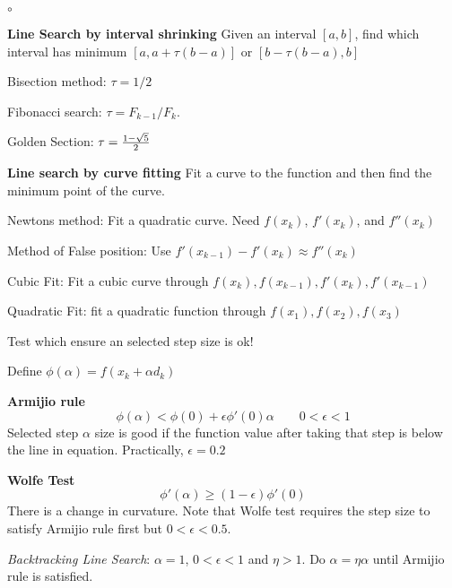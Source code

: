 \begin{slide}
\begin{list}{$\mathbf \circ$}{\setlength{}}
\item[\textbf{Line Search by interval shrinking}]
	Given an interval $[a,b]$, find which interval has minimum $[a,a+\tau(b-a)]$ or $[b-\tau(b-a),b]$
	\item Bisection method: $\tau = 1/2$
	\item Fibonacci search: $\tau = {F_{k-1}/F_k}$.
	\item Golden Section: $\tau = {1-\sqrt{5} \over 2}$
\item[{\bfseries Line search by curve fitting}]
	Fit a curve to the function and then find the minimum point of the curve.
	\item Newtons method: Fit a quadratic curve. Need $f(x_k)$, $f'(x_k)$, and $f''(x_k)$
	\item Method of False position: Use $f'(x_{k-1}) - f'(x_k) \approx f''(x_k)$
	\item Cubic Fit: Fit a cubic curve through  $f(x_k), f(x_{k-1}),f'(x_k), f'(x_{k-1})$
	\item Quadratic Fit: fit a quadratic function through $f(x_1),f(x_2), f(x_3)$
\end{list}
\end{slide}
\begin{slide}
	Test which ensure an selected step size is ok!

	Define $\phi(\alpha) = f(x_k +\alpha d_k)$

	\textbf{Armijio rule}
		$$\phi(\alpha) < \phi(0) + \epsilon \phi'(0)\alpha \qquad 0<\epsilon<1$$
		Selected step $\alpha$ size is good if the function value after taking that step is below the line in equation. Practically, $\epsilon = 0.2$
	
	\textbf{Wolfe Test}
		$$\phi'(\alpha) \geq (1-\epsilon)\phi'(0)$$
			There is a change in curvature. Note that Wolfe test requires the step size to satisfy Armijio rule first but $0<\epsilon<0.5.$

	\textit{Backtracking Line Search}: $\alpha = 1$, $0<\epsilon<1$ and $\eta>1$. Do $\alpha = \eta \alpha$ until Armijio rule is satisfied.
\end{slide}
